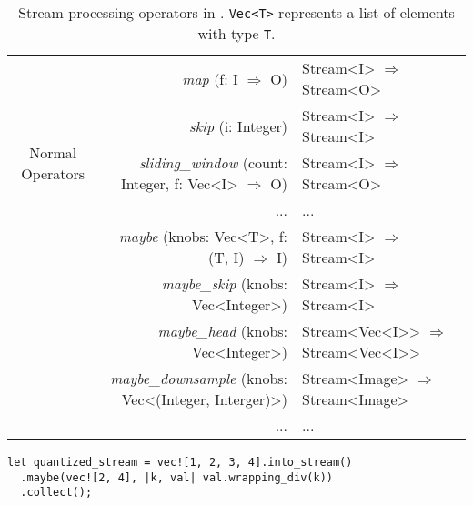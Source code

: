 \begin{table*}
  \footnotesize
  \centering
  \begin{tabular}{ c r l }
    \toprule
    \multirow{5}{*}{Normal Operators}
    & \textit{map} (f: I $\Rightarrow$ O) & Stream<I> $\Rightarrow$ Stream<O> \\
    & \textit{skip} (i: Integer) & Stream<I> $\Rightarrow$
                                   Stream<I> \\
    & \textit{sliding\_window} (count: Integer, f: Vec<I> $\Rightarrow$ O) & Stream<I> $\Rightarrow$
                                                                            Stream<O> \\
    & ... & ... \\
    \midrule
    \multirow{5}{*}{Degradation Operators}
    & \textit{maybe} (knobs: Vec<T>, f:  (T, I) $\Rightarrow$ I) & Stream<I> $\Rightarrow$
                                                                 Stream<I> \\
    & \textit{maybe\_skip} (knobs: Vec<Integer>) & Stream<I> $\Rightarrow$ Stream<I> \\
    & \textit{maybe\_head} (knobs: Vec<Integer>) & Stream<Vec<I>{}> $\Rightarrow$
                                                   Stream<Vec<I>{}> \\
    & \textit{maybe\_downsample} (knobs: Vec<(Integer, Interger)>) & Stream<Image> $\Rightarrow$ Stream<Image> \\
    & ... & ... \\
    \bottomrule
  \end{tabular}
  \caption{Stream processing operators in \sysname{}. \texttt{Vec<T>} represents
    a list of elements with type \texttt{T}.}
  \label{tab:operators}
  \vspace{-1em}
\end{table*}

\vspace{-2pt}
\begin{lstlisting}
let quantized_stream = vec![1, 2, 3, 4].into_stream()
  .maybe(vec![2, 4], |k, val| val.wrapping_div(k))
  .collect();
\end{lstlisting}

